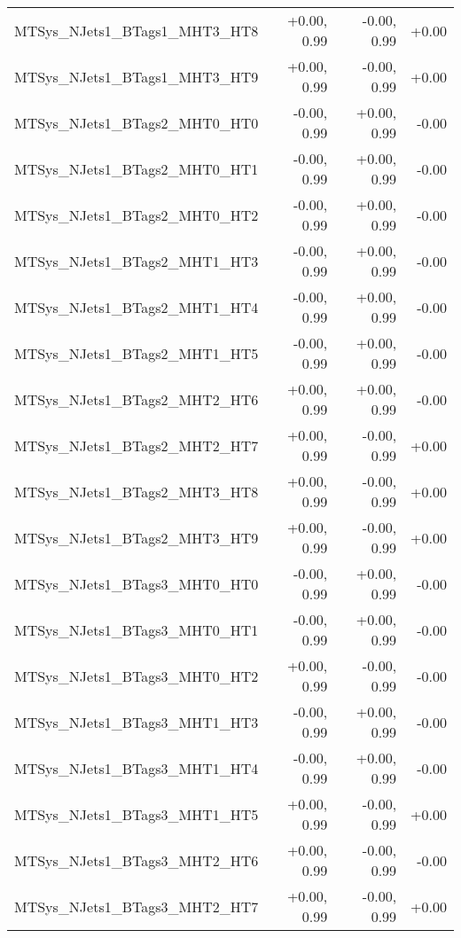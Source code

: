 \begin{tabular}{|l|r|r|r|}
MTSys\_NJets1\_BTags1\_MHT3\_HT8         &      +0.00, 0.99 &     -0.00, 0.99 &  +0.00 \\
MTSys\_NJets1\_BTags1\_MHT3\_HT9         &      +0.00, 0.99 &     -0.00, 0.99 &  +0.00 \\
MTSys\_NJets1\_BTags2\_MHT0\_HT0         &      -0.00, 0.99 &     +0.00, 0.99 &  -0.00 \\
MTSys\_NJets1\_BTags2\_MHT0\_HT1         &      -0.00, 0.99 &     +0.00, 0.99 &  -0.00 \\
MTSys\_NJets1\_BTags2\_MHT0\_HT2         &      -0.00, 0.99 &     +0.00, 0.99 &  -0.00 \\
MTSys\_NJets1\_BTags2\_MHT1\_HT3         &      -0.00, 0.99 &     +0.00, 0.99 &  -0.00 \\
MTSys\_NJets1\_BTags2\_MHT1\_HT4         &      -0.00, 0.99 &     +0.00, 0.99 &  -0.00 \\
MTSys\_NJets1\_BTags2\_MHT1\_HT5         &      -0.00, 0.99 &     +0.00, 0.99 &  -0.00 \\
MTSys\_NJets1\_BTags2\_MHT2\_HT6         &      +0.00, 0.99 &     +0.00, 0.99 &  -0.00 \\
MTSys\_NJets1\_BTags2\_MHT2\_HT7         &      +0.00, 0.99 &     -0.00, 0.99 &  +0.00 \\
MTSys\_NJets1\_BTags2\_MHT3\_HT8         &      +0.00, 0.99 &     -0.00, 0.99 &  +0.00 \\
MTSys\_NJets1\_BTags2\_MHT3\_HT9         &      +0.00, 0.99 &     -0.00, 0.99 &  +0.00 \\
MTSys\_NJets1\_BTags3\_MHT0\_HT0         &      -0.00, 0.99 &     +0.00, 0.99 &  -0.00 \\
MTSys\_NJets1\_BTags3\_MHT0\_HT1         &      -0.00, 0.99 &     +0.00, 0.99 &  -0.00 \\
MTSys\_NJets1\_BTags3\_MHT0\_HT2         &      +0.00, 0.99 &     -0.00, 0.99 &  -0.00 \\
MTSys\_NJets1\_BTags3\_MHT1\_HT3         &      -0.00, 0.99 &     +0.00, 0.99 &  -0.00 \\
MTSys\_NJets1\_BTags3\_MHT1\_HT4         &      -0.00, 0.99 &     +0.00, 0.99 &  -0.00 \\
MTSys\_NJets1\_BTags3\_MHT1\_HT5         &      +0.00, 0.99 &     -0.00, 0.99 &  +0.00 \\
MTSys\_NJets1\_BTags3\_MHT2\_HT6         &      +0.00, 0.99 &     -0.00, 0.99 &  -0.00 \\
MTSys\_NJets1\_BTags3\_MHT2\_HT7         &      +0.00, 0.99 &     -0.00, 0.99 &  +0.00 \\

\end{tabular}
